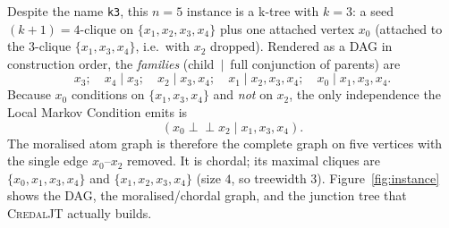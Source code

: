 \documentclass[11pt]{article}
\newcommand{\indep}{\perp\!\!\!\perp}
\begin{document}
Despite the name \texttt{k3}, this $n{=}5$ instance is a k-tree with $k{=}3$:
a seed $(k{+}1){=}4$-clique on $\{x_1,x_2,x_3,x_4\}$ plus one attached vertex
$x_0$ (attached to the $3$-clique $\{x_1,x_3,x_4\}$, i.e.\ with $x_2$ dropped).
Rendered as a DAG in construction order, the \emph{families} (child~$\mid$~full
conjunction of parents) are
\[
x_3;\quad x_4\mid x_3;\quad x_2\mid x_3,x_4;\quad
x_1\mid x_2,x_3,x_4;\quad x_0\mid x_1,x_3,x_4 .
\]
Because $x_0$ conditions on $\{x_1,x_3,x_4\}$ and \emph{not} on $x_2$, the only
independence the Local Markov Condition emits is
\begin{equation}
(x_0 \indep x_2 \mid x_1,x_3,x_4).
\label{eq:lmc}
\end{equation}
The moralised atom graph is therefore the complete graph on five vertices with
the single edge $x_0$--$x_2$ removed. It is chordal; its maximal cliques are
$\{x_0,x_1,x_3,x_4\}$ and $\{x_1,x_2,x_3,x_4\}$ (size $4$, so treewidth $3$).
Figure~\ref{fig:instance} shows the DAG, the moralised/chordal graph, and the
junction tree that \textsc{CredalJT} actually builds.
\end{document}
